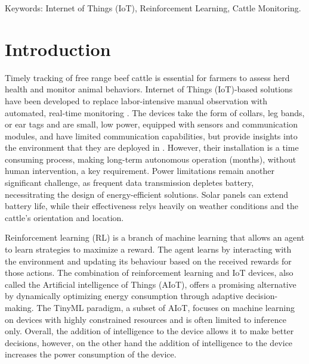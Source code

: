 \documentclass[10pt]{cai}
\begin{document}
\begin{keywords}{Keywords:}
Internet of Things (IoT), Reinforcement Learning, Cattle Monitoring.
\end{keywords}
\copyrightnotice

\section{Introduction}

Timely tracking of free range beef cattle is essential for farmers to assess herd health and monitor animal behaviors. 
Internet of Things (IoT)-based solutions have been developed to replace labor-intensive manual observation with automated, real-time monitoring \cite{unoldIoTBasedCowHealth2020} \cite{yamsaniIoTBasedLivestockMonitoring2024}.
The devices take the form of collars, leg bands, or ear tags and are small, low power, equipped with sensors and communication modules, and have limited communication capabilities, but provide insights into the environment that they are deployed in \cite{unoldIoTBasedCowHealth2020} \cite{moutaouakilDigitalFarmingSurvey2023}.
However, their installation is a time consuming process, making long-term autonomous operation (months), without human intervention, a key requirement.
Power limitations remain another significant challenge, as frequent data transmission depletes battery, necessitrating the design of energy-efficient solutions.
Solar panels can extend battery life, while their effectiveness relys heavily on weather conditions and the cattle's orientation and location.

Reinforcement learning (RL) is a branch of machine learning that allows an agent to learn strategies to maximize a reward.
The agent learns by interacting with the environment and updating its behaviour based on the received rewards for those actions\cite{suttonReinforcementLearningIntroduction2020}.
The combination of reinforcement learning and IoT devices, also called the Artificial intelligence of Things (AIoT), offers a promising alternative by dynamically optimizing energy consumption through adaptive decision-making.
The TinyML paradigm, a subset of AIoT, focuses on machine learning on devices with highly constrained resources and is often limited to inference only\cite{rayReviewTinyMLStateoftheart2022}.
Overall, the addition of intelligence to the device allows it to make better decisions, however, on the other hand the addition of intelligence to the device increases the power consumption of the device.
\end{document}

